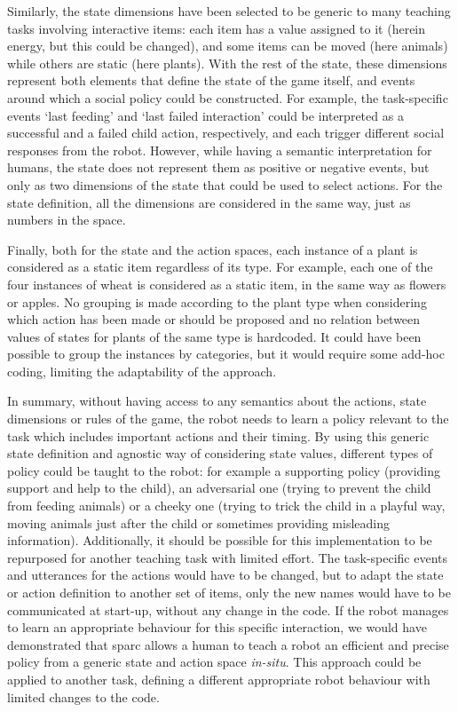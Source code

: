 Similarly, the state dimensions have been selected to be generic to many teaching tasks involving interactive items: each item has a value assigned to it (herein energy, but this could be changed), and some items can be moved (here animals) while others are static (here plants). With the rest of the state, these dimensions represent both elements that define the state of the game itself, and events around which a social policy could be constructed. For example, the task-specific events `last feeding' and `last failed interaction' could be interpreted as a successful and a failed child action, respectively, and each trigger different social responses from the robot. However, while having a semantic interpretation for humans, the state does not represent them as positive or negative events, but only as two dimensions of the state that could be used to select actions. For the state definition, all the dimensions are considered in the same way, just as numbers in the space. 

Finally, both for the state and the action spaces, each instance of a plant is considered as a static item regardless of its type. For example, each one of the four instances of wheat is considered as a static item, in the same way as flowers or apples. No grouping is made according to the plant type when considering which action has been made or should be proposed and no relation between values of states for plants of the same type is hardcoded. It could have been possible to group the instances by categories, but it would require some add-hoc coding, limiting the adaptability of the approach. 

In summary, without having access to any semantics about the actions, state dimensions or rules of the game, the robot needs to learn a policy relevant to the task which includes important actions and their timing. By using this generic state definition and agnostic way of considering state values, different types of policy could be taught to the robot: for example a supporting policy (providing support and help to the child), an adversarial one (trying to prevent the child from feeding animals) or a cheeky one (trying to trick the child in a playful way, moving animals just after the child or sometimes providing misleading information). Additionally, it should be possible for this implementation to be repurposed for another teaching task with limited effort. The task-specific events and utterances for the actions would have to be changed, but to adapt the state or action definition to another set of items, only the new names would have to be communicated at start-up, without any change in the code. If the robot manages to learn an appropriate behaviour for this specific interaction, we would have demonstrated that \gls{sparc} allows a human to teach a robot an efficient and precise policy from a generic state and action space \emph{in-situ}. This approach could be applied to another task, defining a different appropriate robot behaviour with limited changes to the code.

